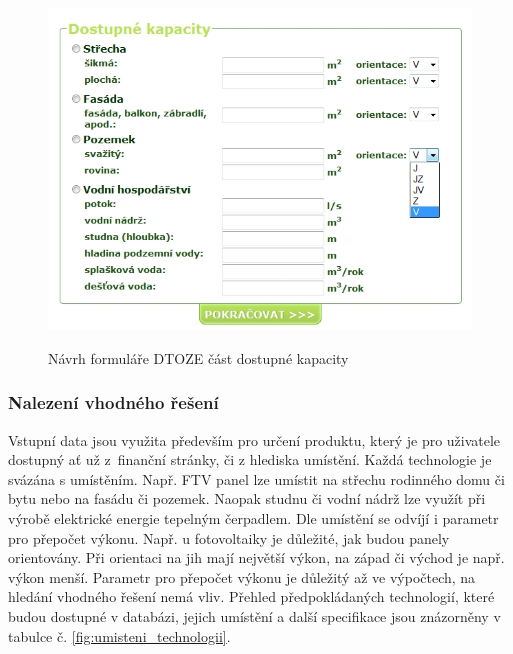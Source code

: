 \documentclass[11pt,a4paper]{article}
\begin{document}
\begin{figure}[H] 
\centering 
\caption{Návrh formuláře DTOZE část dostupné kapacity} 
\includegraphics[scale=0.6]{DTOZE_formular_navrhC} 
\label{fig:formular_navrhC}
\end{figure} 

\subsubsection{Nalezení vhodného řešení} 
Vstupní data jsou využita především pro určení produktu, který je pro uživatele dostupný ať už z~finanční stránky, či z hlediska umístění. Každá technologie je svázána s umístěním. Např. FTV panel lze umístit na střechu rodinného domu či bytu nebo na fasádu či pozemek. Naopak studnu či vodní nádrž lze využít při výrobě elektrické energie tepelným čerpadlem. Dle umístění se odvíjí i parametr pro přepočet výkonu. Např. u fotovoltaiky je důležité, jak budou panely orientovány. Při orientaci na jih mají největší výkon, na západ či východ je např. výkon menší. Parametr pro přepočet výkonu je důležitý až ve výpočtech, na hledání vhodného řešení nemá vliv. Přehled předpokládaných technologií, které budou dostupné v databázi, jejich umístění a další specifikace jsou znázorněny v tabulce č. \ref{fig:umisteni_technologii}.
\end{document}

